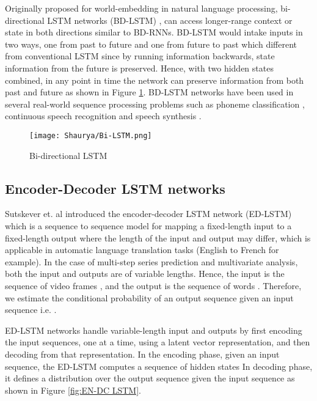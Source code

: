 \documentclass[final,5p,times,twocolumn]{elsarticle}
\begin{document}
Originally proposed for world-embedding in natural language processing,  bi-directional LSTM networks (BD-LSTM)  \cite{graves2005}, can access longer-range context or state in both  directions similar to BD-RNNs.  
BD-LSTM would intake inputs in two ways, one from past to future and one from future to past which different from conventional LSTM since by running information backwards, state information from the future is preserved. Hence, with two hidden states combined, in any point in time the network can preserve information from both past and future as shown in Figure \ref{fig:BDLSTM}.
BD-LSTM networks have been used in several real-world sequence processing problems such as phoneme classification
\cite{graves2005}, continuous speech recognition \cite{Fan2014TTSSW} and speech synthesis \cite{graves2013hybrid}.
 
 
 
 \begin{figure}[htbp!]
  \begin{center}  
   \texttt{[image: Shaurya/Bi-LSTM.png]} \\
    \caption{ Bi-directional LSTM}
\label{fig:BDLSTM}
  \end{center}
\end{figure}
 
 \subsection{Encoder-Decoder LSTM networks} 
 
 Sutskever et. al \cite{NIPS2014_5346} introduced the encoder-decoder LSTM network (ED-LSTM) which is a sequence to sequence model for mapping a fixed-length input to a fixed-length output where the length of the input and output may differ, which is applicable in automatic language translation tasks (English to French for example). In the case of multi-step series prediction and multivariate analysis,  both the input and outputs are of
variable lengths. Hence,  the input is the sequence of video frames
, and the output is the sequence of words
. Therefore, we estimate the conditional probability of
an output sequence  given an input sequence
 i.e.
.




ED-LSTM networks  handle variable-length input and outputs by  first encoding the input sequences, one at a time,
 using a latent vector representation,
and then decoding from that representation. 
In the encoding phase, given an input sequence, the ED-LSTM computes a sequence of hidden
states In decoding phase, it defines a distribution over the output sequence   given the input sequence  as shown in Figure \ref{fig:EN-DC LSTM}. 
\end{document}
